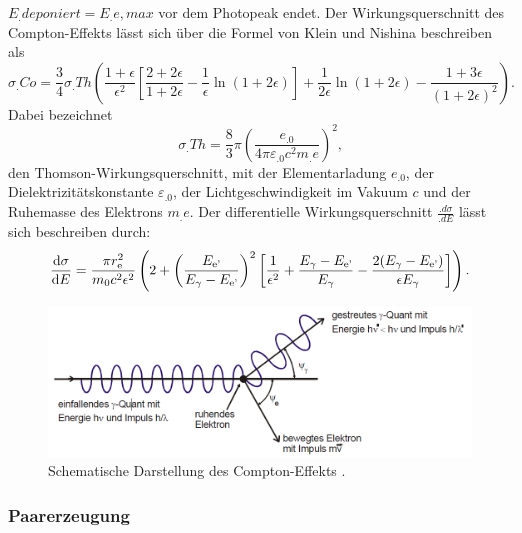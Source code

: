 $E_.{deponiert}=E_.{e,max}$ vor dem Photopeak endet.
Der Wirkungsquerschnitt des Compton-Effekts lässt sich über die Formel von Klein und Nishina beschreiben als
\begin{equation}
\sigma_.{Co}=\frac{3}{4}\sigma_.{Th}\left(\frac{1+\epsilon}{\epsilon^2}\left[\frac{2+2\epsilon}{1+2\epsilon}-\frac{1}{\epsilon}\ln(1+2\epsilon)\right]+\frac{1}{2\epsilon}\ln(1+2\epsilon)-\frac{1+3\epsilon}{(1+2\epsilon)^2}\right)\text{.}\label{eq:sig_Co}
\end{equation}
Dabei bezeichnet 
\[
\sigma_.{Th}=\frac{8}{3}\pi\left(\frac{e_.0}{4\pi\varepsilon_.0c^2m_.e}\right)^2\text{,}
\] 
den Thomson-Wirkungsquerschnitt, mit der Elementarladung $e_.0$, der Dielektrizitätskonstante $\varepsilon_.0$, der Lichtgeschwindigkeit im Vakuum $c$ und der Ruhemasse des Elektrons $m_.e$.
Der differentielle Wirkungsquerschnitt $\frac{.d\sigma}{.dE}$ lässt sich beschreiben durch:
\begin{equation}
\frac{\mathop{}\!\mathrm{d} \sigma}{\mathop{}\!\mathrm{d} E} =  \frac{\pi r_\text{e}^2}{m_0 c^2 \epsilon^2}\left(2+\left(\frac{E_\text{e'}}{E_\gamma - E_\text{e'}}\right)^2 \left[ \frac{1}{\epsilon^2} +\frac{E_\gamma - E_\text{e'}}{E_\gamma} - \frac{2(E_\gamma - E_\text{e'})}{\epsilon E_\gamma} \right]\right) \text{.}\label{eq:sigmadiff}
\end{equation}

\begin{figure}
	\centering
	\includegraphics[width=\linewidth-60pt,height=\textheight-60pt,keepaspectratio]{content/images/Compton.pdf}
	\caption{Schematische Darstellung des Compton-Effekts \cite{V18}.}
	\label{fig:Compton}
\end{figure}

\subsubsection{Paarerzeugung}

